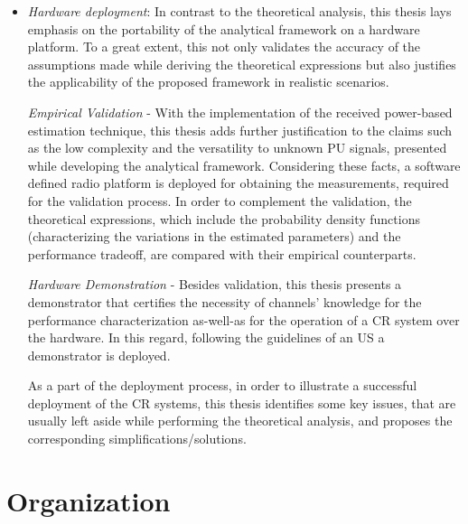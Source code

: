 \begin{itemize}
 
\item \textit{Hardware deployment}: 
In contrast to the theoretical analysis, this thesis lays emphasis on the portability of the analytical framework on a hardware platform. To a great extent, this not only validates the accuracy of the assumptions made while deriving the theoretical expressions but also justifies the applicability of the proposed framework in realistic scenarios. \begin{mdframed}[style=MyFrame] \textit{Empirical Validation} - With the implementation of the received power-based estimation technique, this thesis adds further justification to the claims such as the low complexity and the versatility to unknown PU signals, presented while developing the analytical framework. Considering these facts, a software defined radio platform is deployed for obtaining the measurements, required for the validation process. In order to complement the validation, the theoretical expressions, which include the probability density functions (characterizing the variations in the estimated parameters) and the performance tradeoff, are compared with their empirical counterparts. \end{mdframed} \begin{mdframed}[style=MyFrame] \textit{Hardware Demonstration} - Besides validation, this thesis presents a demonstrator that certifies the necessity of channels' knowledge for the performance characterization as-well-as for the operation of a CR system over the hardware. In this regard, following the guidelines of an US a demonstrator is deployed. \end{mdframed} As a part of the deployment process, %
in order to illustrate a successful deployment of the CR systems, this thesis identifies some key issues, that are usually left aside while performing the theoretical analysis, and proposes the corresponding simplifications/solutions.  
\end{itemize}

\section{Organization} %

